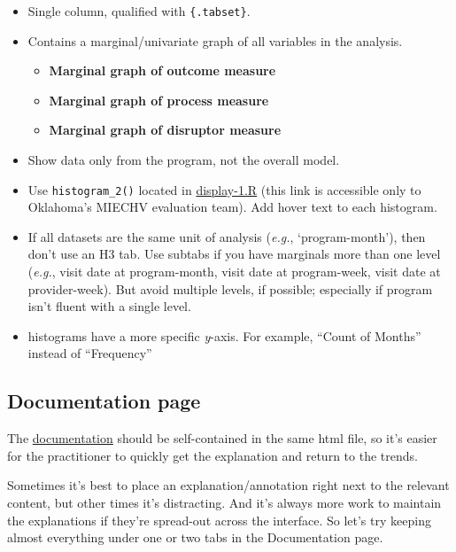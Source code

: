 \documentclass[
]{book}
\providecommand{\tightlist}{%
  \setlength{\itemsep}{0pt}\setlength{\parskip}{0pt}}
\begin{document}
\begin{itemize}
\item
  Single column, qualified with \texttt{\{.tabset\}}.
\item
  Contains a marginal/univariate graph of all variables in the analysis.

  \begin{itemize}
  \tightlist
  \item
    \textbf{Marginal graph of outcome measure}
  \item
    \textbf{Marginal graph of process measure}
  \item
    \textbf{Marginal graph of disruptor measure}
  \end{itemize}
\item
  Show data only from the program, not the overall model.
\item
  Use \texttt{histogram\_2()} located in \href{https://github.com/OuhscBbmc/miechv-3/blob/master/analysis/common/display-1.R}{display-1.R} (this link is accessible only to Oklahoma's MIECHV evaluation team). Add hover text to each histogram.
\item
  If all datasets are the same unit of analysis (\emph{e.g.}, `program-month'), then don't use an H3 tab. Use subtabs if you have marginals more than one level (\emph{e.g.}, visit date at program-month, visit date at program-week, visit date at provider-week). But avoid multiple levels, if possible; especially if program isn't fluent with a single level.
\item
  histograms have a more specific \emph{y}-axis. For example, ``Count of Months'' instead of ``Frequency''
\end{itemize}

\hypertarget{documentation-page}{%
\subsection{Documentation page}\label{documentation-page}}

The \href{https://ouhscbbmc.github.io/data-science-practices-1/dashboard-1.html\#documentation}{documentation} should be self-contained in the same html file, so it's easier for the practitioner to quickly get the explanation and return to the trends.

Sometimes it's best to place an explanation/annotation right next to the relevant content, but other times it's distracting. And it's always more work to maintain the explanations if they're spread-out across the interface. So let's try keeping almost everything under one or two tabs in the Documentation page.
\end{document}
